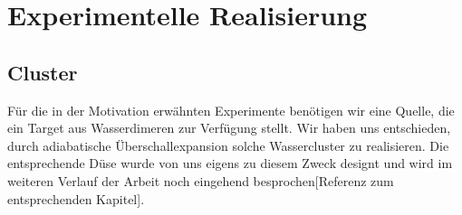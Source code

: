 \chapter{Experimentelle Realisierung} 

\section{Cluster}

Für die in der Motivation erwähnten Experimente benötigen wir eine Quelle, die ein Target aus Wasserdimeren zur Verfügung stellt. Wir haben uns entschieden, durch adiabatische Überschallexpansion solche Wassercluster zu realisieren. Die entsprechende Düse wurde von uns eigens zu diesem Zweck designt und wird im weiteren Verlauf der Arbeit noch eingehend besprochen[Referenz zum entsprechenden Kapitel].


